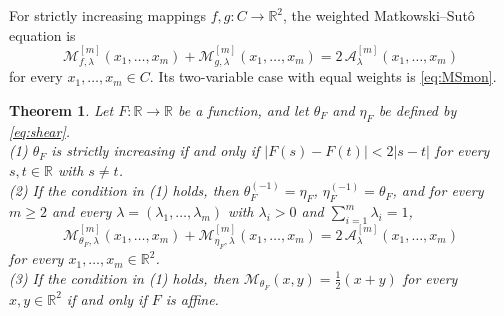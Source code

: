 \documentclass[a4paper, reqno, 11pt]{amsart}
\newtheorem{Thm}{Theorem}[section]
\theoremstyle{definition}
\begin{document}
For strictly increasing mappings $f,g \colon C \to \mathbb{R}^2$, the weighted Matkowski--Sut\^o equation is
\begin{equation}\label{eq:MSmon-weighted}
\mathcal{M}^{[m]}_{f,\lambda}(x_1, \dots, x_m)
+\mathcal{M}^{[m]}_{g,\lambda}(x_1, \dots, x_m)
=2\,\mathcal{A}^{[m]}_{\lambda}(x_1, \dots, x_m)
\end{equation}
for every $x_1, \dots, x_m \in C$.
Its two-variable case with equal weights is \eqref{eq:MSmon}.

\begin{Thm}\label{thm:shear-weighted}
Let $F \colon \mathbb{R} \to \mathbb{R}$ be a function, and let $\theta_F$ and $\eta_F$ be defined by \eqref{eq:shear}. \\
(1) $\theta_F$ is strictly increasing if and only if $|F(s)-F(t)|<2|s-t|$ for every $s,t\in\mathbb{R}$ with $s\neq t$. \\
(2) If the condition in (1) holds, then $\theta_F^{(-1)}=\eta_F$, $\eta_F^{(-1)}=\theta_F$, and for every $m\ge 2$ and every $\lambda=(\lambda_1,\dots,\lambda_m)$ with $\lambda_i>0$ and $\sum_{i=1}^m\lambda_i=1$,
\begin{equation}\label{eq:shearMS-weighted}
\mathcal{M}^{[m]}_{\theta_F,\lambda}(x_1,\dots,x_m)
+\mathcal{M}^{[m]}_{\eta_F,\lambda}(x_1,\dots,x_m)
=2\,\mathcal{A}^{[m]}_{\lambda}(x_1,\dots,x_m)
\end{equation}
for every $x_1,\dots,x_m\in\mathbb{R}^2$. \\
(3) If the condition in (1) holds, then $\mathcal{M}_{\theta_F}(x,y)=\tfrac{1}{2}(x+y)$ for every $x,y\in\mathbb{R}^2$ if and only if $F$ is affine.
\end{Thm}
\end{document}
